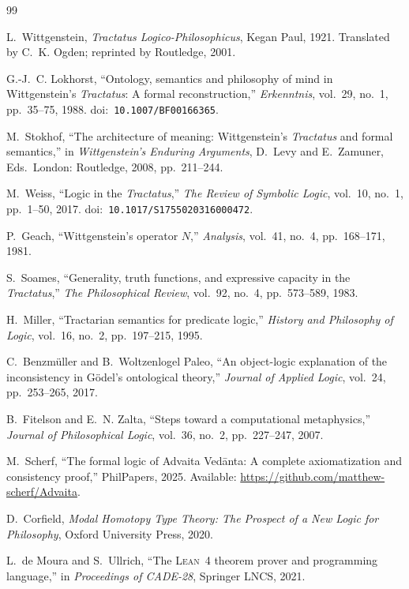 \documentclass[10pt, letterpaper]{article}
\theoremstyle{definition}
\theoremstyle{remark}
\begin{document}

\begin{thebibliography}{99}

L.~Wittgenstein,
\emph{Tractatus Logico-Philosophicus},
Kegan Paul, 1921.
Translated by C.~K. Ogden; reprinted by Routledge, 2001.

G.-J.~C. Lokhorst,
``Ontology, semantics and philosophy of mind in Wittgenstein's
\emph{Tractatus}: A formal reconstruction,''
\emph{Erkenntnis}, vol.~29, no.~1, pp.~35--75, 1988.
doi:~\texttt{10.1007/BF00166365}.

M.~Stokhof,
``The architecture of meaning: Wittgenstein's \emph{Tractatus} and
formal semantics,''
in \emph{Wittgenstein's Enduring Arguments},
D.~Levy and E.~Zamuner, Eds.\
London: Routledge, 2008, pp.~211--244.

M.~Weiss,
``Logic in the \emph{Tractatus},''
\emph{The Review of Symbolic Logic}, vol.~10, no.~1,
pp.~1--50, 2017.
doi:~\texttt{10.1017/S1755020316000472}.

P.~Geach,
``Wittgenstein's operator $N$,''
\emph{Analysis}, vol.~41, no.~4, pp.~168--171, 1981.

S.~Soames,
``Generality, truth functions, and expressive capacity in the
\emph{Tractatus},''
\emph{The Philosophical Review}, vol.~92, no.~4, pp.~573--589, 1983.

H.~Miller,
``Tractarian semantics for predicate logic,''
\emph{History and Philosophy of Logic}, vol.~16, no.~2,
pp.~197--215, 1995.

C.~Benzm\"uller and B.~Woltzenlogel Paleo,
``An object-logic explanation of the inconsistency in G\"odel's
ontological theory,''
\emph{Journal of Applied Logic}, vol.~24, pp.~253--265, 2017.

B.~Fitelson and E.~N. Zalta,
``Steps toward a computational metaphysics,''
\emph{Journal of Philosophical Logic}, vol.~36, no.~2,
pp.~227--247, 2007.

M.~Scherf,
``The formal logic of Advaita Ved\=anta: A complete
axiomatization and consistency proof,''
PhilPapers, 2025.
Available: \url{https://github.com/matthew-scherf/Advaita}.

D.~Corfield,
\emph{Modal Homotopy Type Theory: The Prospect of a New Logic
for Philosophy},
Oxford University Press, 2020.

L.~de Moura and S.~Ullrich,
``The \textsc{Lean}~4 theorem prover and programming language,''
in \emph{Proceedings of CADE-28}, Springer LNCS, 2021.

\end{thebibliography}
\end{document}
